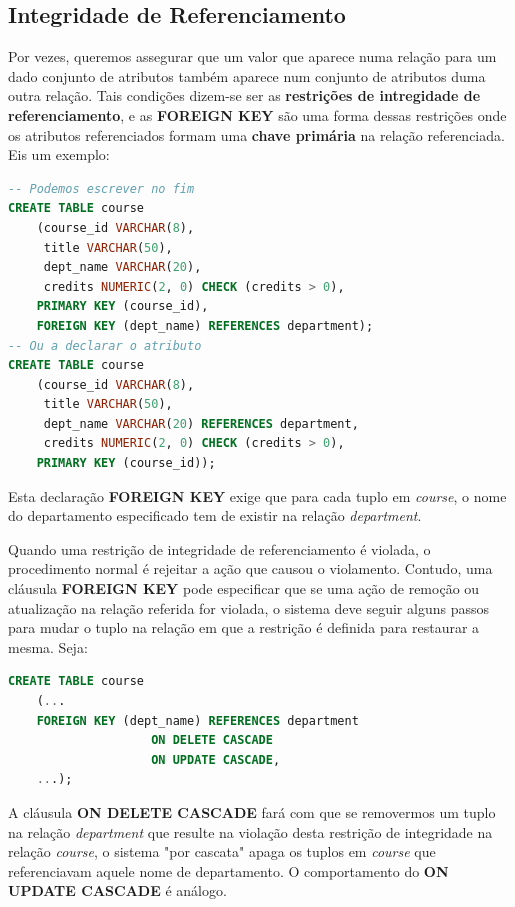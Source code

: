 \documentclass[oneside]{book}
\theoremstyle{definition}
\begin{document}
\subsection{Integridade de Referenciamento}
Por vezes, queremos assegurar que um valor que aparece numa relação para um dado conjunto de atributos também aparece num conjunto de atributos duma outra relação. Tais condições dizem-se ser as \textbf{restrições de intregidade de referenciamento}, e as \textbf{FOREIGN KEY} são uma forma dessas restrições onde os atributos referenciados formam uma \textbf{chave primária} na relação referenciada. Eis um exemplo:
\begin{lstlisting}[language=SQL, morekeywords={REFERENCES, REFRESH, MATERIALIZED, CONCURRENTLY}, framesep=8pt, xleftmargin=40pt, framexleftmargin=40pt, frame=tb, framerule=0pt]
-- Podemos escrever no fim
CREATE TABLE course
    (course_id VARCHAR(8),
     title VARCHAR(50),
     dept_name VARCHAR(20),
     credits NUMERIC(2, 0) CHECK (credits > 0),
    PRIMARY KEY (course_id),
    FOREIGN KEY (dept_name) REFERENCES department);
-- Ou a declarar o atributo
CREATE TABLE course
    (course_id VARCHAR(8),
     title VARCHAR(50),
     dept_name VARCHAR(20) REFERENCES department,
     credits NUMERIC(2, 0) CHECK (credits > 0),
    PRIMARY KEY (course_id));
\end{lstlisting}

Esta declaração \textbf{FOREIGN KEY} exige que para cada tuplo em \textit{course}, o nome do departamento especificado tem de existir na relação \textit{department}.

Quando uma restrição de integridade de referenciamento é violada, o procedimento normal é rejeitar a ação que causou o violamento. Contudo, uma cláusula \textbf{FOREIGN KEY} pode especificar que se uma ação de remoção ou atualização na relação referida for violada, o sistema deve seguir alguns passos para mudar o tuplo na relação em que a restrição é definida para restaurar a mesma. Seja:
\begin{lstlisting}[language=SQL, morekeywords={REFERENCES, REFRESH, MATERIALIZED, CONCURRENTLY}, framesep=8pt, xleftmargin=40pt, framexleftmargin=40pt, frame=tb, framerule=0pt]
CREATE TABLE course
    (...
    FOREIGN KEY (dept_name) REFERENCES department
                    ON DELETE CASCADE
                    ON UPDATE CASCADE,
    ...);
\end{lstlisting}
A cláusula \textbf{ON DELETE CASCADE} fará com que se removermos um tuplo na relação \textit{department} que resulte na violação desta restrição de integridade na relação \textit{course}, o sistema "por cascata" apaga os tuplos em \textit{course} que referenciavam aquele nome de departamento. O comportamento do \textbf{ON UPDATE CASCADE} é análogo.
\end{document}
